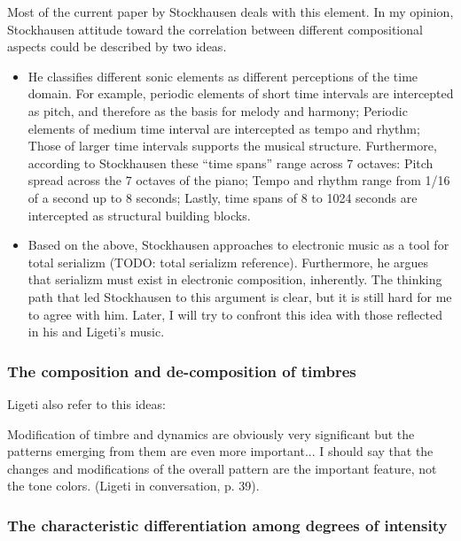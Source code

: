 \documentclass[a4paper,11pt]{article}
\newenvironment{MyShadequote}[1][]{%
    \ignorespaces%
    \begin{mdframed}[style=MyShadeQuoteStyle,#1]%
}{%
    \end{mdframed}%
    \ignorespacesafterend%
}%
\begin{document}
Most of the current paper by Stockhausen deals with this element.
In my opinion, Stockhausen attitude toward the correlation between different compositional aspects could be described by two ideas.

\begin{itemize}
  \item He classifies different sonic elements as different perceptions of the time domain.
  For example, periodic elements of short time intervals are intercepted as pitch, and therefore as the basis for melody and harmony;
  Periodic elements of medium time interval are intercepted as tempo and rhythm;
  Those of larger time intervals supports the musical structure.
  Furthermore, according to Stockhausen these ``time spans'' range across 7 octaves:
  Pitch spread across the 7 octaves of the piano;
  Tempo and rhythm range from 1/16 of a second up to 8 seconds;
  Lastly, time spans of 8 to 1024 seconds are intercepted as structural building blocks.

  \item Based on the above, Stockhausen approaches to electronic music as a tool for total serializm (TODO: {total serializm reference}).
  Furthermore, he argues that serializm must exist in electronic composition, inherently.
  The thinking path that led Stockhausen to this argument is clear, but it is still hard for me to agree with him.
  Later, I will try to confront this idea with those reflected in his and Ligeti's music.
\end{itemize}

\subsubsection{The composition and de-composition of timbres}
\label{subs:stockhausen:timber}

Ligeti also refer to this ideas:

\begin{MyShadequote}
  Modification of timbre and dynamics are obviously very significant but the patterns emerging from them are even more important...
  I should say that the changes and modifications of the overall pattern are the important feature, not the tone colors. (Ligeti in conversation, p. 39).
\end{MyShadequote}

\subsubsection{The characteristic differentiation among degrees of intensity}
\label{subs:stockhausen:intensity}
\end{document}
